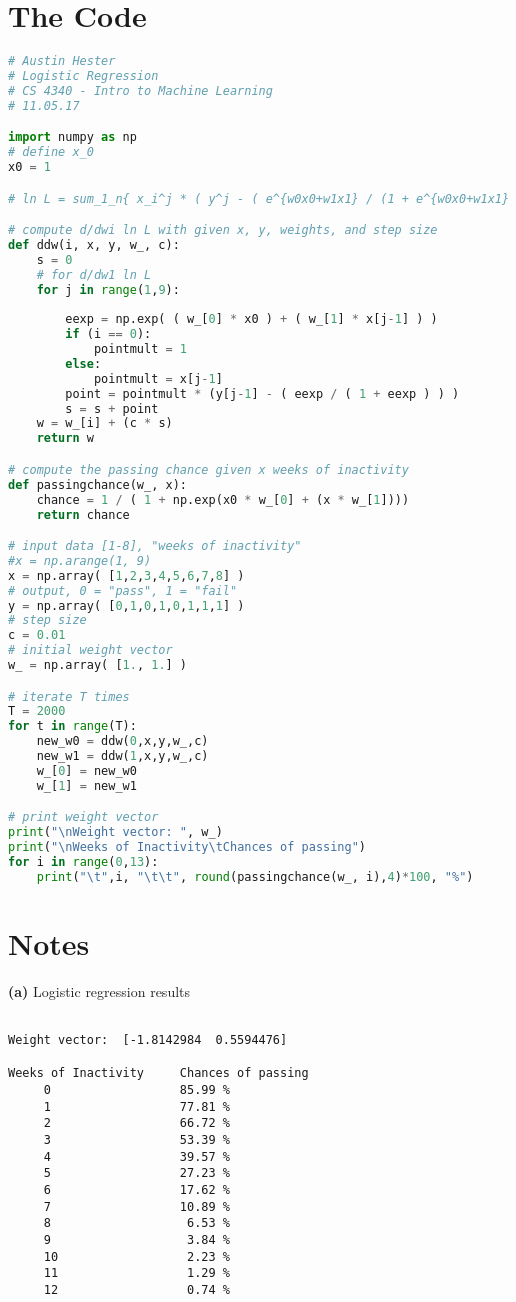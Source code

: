 \documentclass{article}
\begin{document}
\section*{The Code}
\lstset{
	frame=tb,
	tabsize=4,
	showstringspaces=false
}
\begin{lstlisting}[language=Python,breaklines=true]
# Austin Hester
# Logistic Regression
# CS 4340 - Intro to Machine Learning
# 11.05.17

import numpy as np
# define x_0
x0 = 1

# ln L = sum_1_n{ x_i^j * ( y^j - ( e^{w0x0+w1x1} / (1 + e^{w0x0+w1x1} )))}

# compute d/dwi ln L with given x, y, weights, and step size
def ddw(i, x, y, w_, c):
    s = 0
    # for d/dw1 ln L
    for j in range(1,9):
        
        eexp = np.exp( ( w_[0] * x0 ) + ( w_[1] * x[j-1] ) ) 
        if (i == 0):
            pointmult = 1
        else:
            pointmult = x[j-1]
        point = pointmult * (y[j-1] - ( eexp / ( 1 + eexp ) ) ) 
        s = s + point
    w = w_[i] + (c * s)
    return w

# compute the passing chance given x weeks of inactivity
def passingchance(w_, x):
    chance = 1 / ( 1 + np.exp(x0 * w_[0] + (x * w_[1])))
    return chance

# input data [1-8], "weeks of inactivity"
#x = np.arange(1, 9)
x = np.array( [1,2,3,4,5,6,7,8] )
# output, 0 = "pass", 1 = "fail"
y = np.array( [0,1,0,1,0,1,1,1] )
# step size
c = 0.01
# initial weight vector
w_ = np.array( [1., 1.] )

# iterate T times
T = 2000
for t in range(T):
    new_w0 = ddw(0,x,y,w_,c)
    new_w1 = ddw(1,x,y,w_,c)
    w_[0] = new_w0
    w_[1] = new_w1

# print weight vector
print("\nWeight vector: ", w_)
print("\nWeeks of Inactivity\tChances of passing")
for i in range(0,13):
    print("\t",i, "\t\t", round(passingchance(w_, i),4)*100, "%")

\end{lstlisting}


\section*{Notes}

\hspace{-2.5em} \textbf{(a)} Logistic regression results 
\begin{lstlisting}[breaklines=true,basicstyle=\small]

Weight vector:  [-1.8142984  0.5594476]

Weeks of Inactivity		Chances of passing
	 0 					85.99 %
	 1 					77.81 %
	 2 		 			66.72 %
	 3 		 			53.39 %
	 4 		 			39.57 %
	 5 		 			27.23 %
	 6 		 			17.62 %
	 7 		 			10.89 %
	 8 		 			 6.53 %
	 9 		 			 3.84 %
	 10 			 	 2.23 %
	 11 		 		 1.29 %
	 12 		 		 0.74 %
\end{lstlisting}
\end{document}
